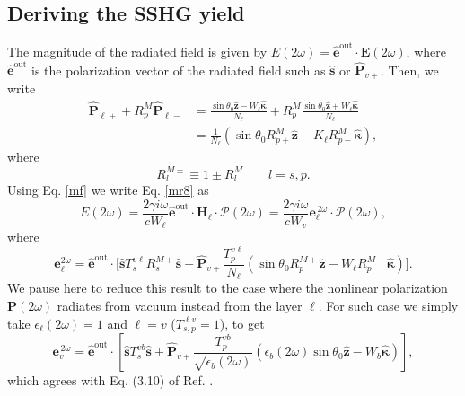 
\subsection{Deriving the SSHG yield}

The magnitude of the radiated field is given by $E(2\omega) =
\hat{\mathbf{e}}^{\mathrm{out}}\cdot\mathbf{E}(2\omega)$, where
$\hat{\mathbf{e}}^{\mathrm{out}}$ is the polarization vector of the radiated
field such as $\hat{\mathbf{s}}$ or $\hat{\mathbf{P}}_{v+}$. Then, we write
\begin{equation}
\begin{split}
\hat{\mathbf{P}}_{\ell +} + R^{M}_{p}\hat{\mathbf{P}}_{\ell -}
&= \frac{\sin\theta_{0}\hat{\mathbf{z}} - W_{\ell}\hat{\boldsymbol{\kappa}}}
        {N_{\ell}}
 + R^{M}_{p}
   \frac{\sin\theta_{0}\hat{\mathbf{z}} + W_{\ell}\hat{\boldsymbol{\kappa}}}
        {N_{\ell}}\\
&= \frac{1}{N_{\ell}}
\left(
\sin\theta_{0}R^{M}_{p+}\hat{\mathbf{z}}
- K_{\ell}R^{M}_{p-}\hat{\boldsymbol{\kappa}}
\right),
\end{split}
\end{equation}
where
\begin{equation}\label{rm}
R^{M\pm}_{l}\equiv 1 \pm R^{M}_{l} \qquad l=s,p.
\end{equation}
Using Eq. \eqref{mf} we write Eq. \eqref{mr8} as
\begin{equation}\label{r10}
E(2\omega) = \frac{2\gamma i\omega}{cW_\ell}
\hat{\mathbf{e}}^{\mathrm{out}}\cdot\mathbf{H}_{\ell}\cdot
\boldsymbol{\mathcal{P}}(2\omega) 
= \frac{2\gamma i \omega}{cW_{v}}
\mathbf{e}^{\,2\omega}_{\ell}\cdot\boldsymbol{\mathcal{P}}(2\omega),
\end{equation}
where
\begin{equation}\label{r12mm}
\mathbf{e}^{2\omega}_{\ell} =\hat{\mathbf{e}}^{\mathrm{out}}\cdot 
\Bigg[
\hat{\mathbf{s}}T_{s}^{v\ell}R^{M+}_{s}\hat{\mathbf{s}} + 
\hat{\mathbf{P}}_{v+}
\frac{T^{v\ell}_{p}}
     {N_{\ell}}
\left(
\sin\theta_{0}R^{M+}_{p}\hat{\mathbf{z}}
- W_{\ell}R^{M-}_{p}\hat{\boldsymbol{\kappa}}
\right) 
\Bigg]. 
\end{equation}  
We pause here to reduce this result to the case where the nonlinear polarization
$\mathbf{P}(2\omega)$ radiates from vacuum instead from the layer $\ell$. For
such case we simply take $\epsilon_{\ell}(2\omega) = 1$ and $\ell = v$ ($T^{\ell
v}_{s,p} = 1$), to get
\begin{equation}\label{r13}
\mathbf{e}^{\,2\omega}_{v} = \hat{\mathbf{e}}^{\mathrm{out}}\cdot
\left[
\hat{\mathbf{s}}T_{s}^{v b}\hat{\mathbf{s}} + \hat{\mathbf{P}}_{v+}
\frac{T^{v b}_{p}}{\sqrt{\epsilon_{b}(2\omega)}}
\left(
  \epsilon_{b}(2\omega)\sin\theta_{0}\hat{\mathbf{z}}
- W_{b}\hat{\boldsymbol{\kappa}}
\right) 
\right],
\end{equation}
which agrees with Eq. (3.10) of Ref. \cite{mizrahiJOSA88}.

